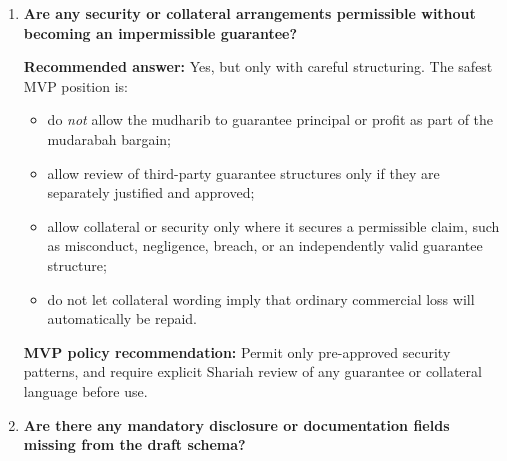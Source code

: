 \documentclass[11pt]{article}
\begin{document}
\begin{enumerate}[leftmargin=1.8em,label=\textbf{Q\arabic*.}]
    \textbf{Implementation note:} No automated rule should reallocate loss to the mudharib without documented human review.

    \item \textbf{Are any security or collateral arrangements permissible without becoming an impermissible guarantee?}

    \textbf{Recommended answer:} Yes, but only with careful structuring. The safest MVP position is:
    \begin{itemize}[leftmargin=1.5em]
        \item do \emph{not} allow the mudharib to guarantee principal or profit as part of the mudarabah bargain;
        \item allow review of third-party guarantee structures only if they are separately justified and approved;
        \item allow collateral or security only where it secures a permissible claim, such as misconduct, negligence, breach, or an independently valid guarantee structure;
        \item do not let collateral wording imply that ordinary commercial loss will automatically be repaid.
    \end{itemize}

    \textbf{MVP policy recommendation:} Permit only pre-approved security patterns, and require explicit Shariah review of any guarantee or collateral language before use.

    \item \textbf{Are there any mandatory disclosure or documentation fields missing from the draft schema?}


\end{enumerate}
\end{document}
